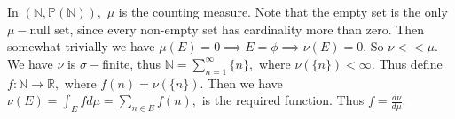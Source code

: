 \documentclass{article}
\begin{document}
\section{} %
\section{} %
\section{} %
In $(\mathbb{N},\mathbb{P(N)}),$ $\mu$ is the counting measure. Note that the empty set is the only $\mu-$null set, since every non-empty set has 
cardinality more than zero. Then somewhat trivially we have $\mu(E)=0 \implies E=\phi \implies \nu(E)=0.$ So $\nu << \mu.$ We have $\nu$ is $\sigma-$finite, 
thus $\mathbb{N}=\sum_{n=1}^{\infty}\{n\},$ where $\nu(\{n\})<\infty.$ Thus define $f: \mathbb{N} \rightarrow \mathbb{R},$ where $f(n)=\nu(\{n\}).$ Then we 
have $\nu(E)=\int_E f d\mu=\sum_{n \in E}f(n),$ is the required function. Thus $f=\frac{d\nu}{d\mu}.$
\section{} %
\section{} %
\section{} %
\section{} %
\end{document}
